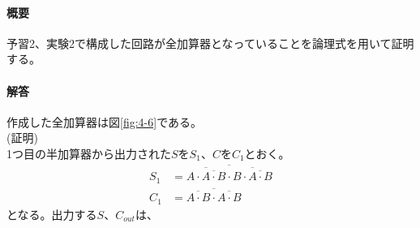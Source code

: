 \documentclass[dvipdfmx]{jsarticle}
\begin{document}
\paragraph{概要}
予習2、実験2で構成した回路が全加算器となっていることを論理式を用いて証明する。

\paragraph{解答}
作成した全加算器は図\ref*{fig:4-6}である。\\
(証明)\\
1つ目の半加算器から出力された$S$を$S_1$、$C$を$C_1$とおく。
\begin{align}
  S_1 &= \overline{\overline{A \cdot \overline{A \cdot B}} \cdot \overline{B \cdot \overline{A \cdot B}}} \label{eq:10}\\
  C_1 &= \overline{\overline{A \cdot B} \cdot \overline{A \cdot B}} \label{eq:11}
\end{align}
となる。出力する$S$、$C_{out}$は、
\end{document}
